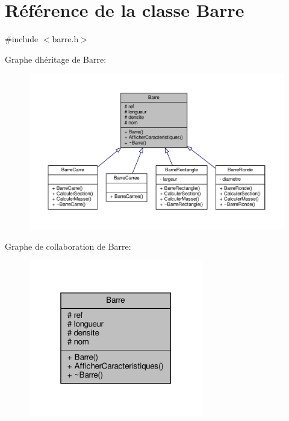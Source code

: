 \hypertarget{class_barre}{}\section{Référence de la classe Barre}
\label{class_barre}


{\ttfamily \#include $<$barre.\+h$>$}



Graphe d\textquotesingle{}héritage de Barre\+:
\nopagebreak
\begin{figure}[H]
\begin{center}
\leavevmode
\includegraphics[width=350pt]{class_barre__inherit__graph}
\end{center}
\end{figure}


Graphe de collaboration de Barre\+:
\nopagebreak
\begin{figure}[H]
\begin{center}
\leavevmode
\includegraphics[width=217pt]{class_barre__coll__graph}
\end{center}
\end{figure}
